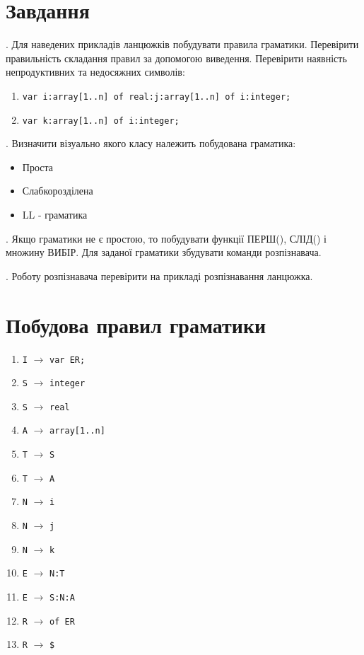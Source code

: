 \section{Завдання}
. Для наведених прикладів ланцюжків побудувати правила граматики.
Перевірити правильність складання правил за допомогою виведення.
Перевірити наявність непродуктивних та недосяжних символів:

\begin{enumerate}
    \item \verb|var i:array[1..n] of real:j:array[1..n] of i:integer;|
    \item \verb|var k:array[1..n] of i:integer;|
\end{enumerate}

. Визначити візуально якого класу належить побудована граматика:
\begin{itemize}
    \item Проста
    \item Слабкорозділена
    \item LL - граматика
\end{itemize}

. Якщо граматики не є простою, то побудувати функції ПЕРШ(), СЛІД()
і множину ВИБІР. Для заданої граматики збудувати команди розпізнавача.

. Роботу розпізнавача перевірити на прикладі розпізнавання ланцюжка.


\newpage
\section{Побудова правил граматики}
\begin{enumerate}
    \item  \verb|I| $\to$ \verb|var ER;|
    \item  \verb|S| $\to$ \verb|integer|
    \item  \verb|S| $\to$ \verb|real|
    \item  \verb|A| $\to$ \verb|array[1..n]|
    \item  \verb|T| $\to$ \verb|S|
    \item  \verb|T| $\to$ \verb|A|
    \item  \verb|N| $\to$ \verb|i|
    \item  \verb|N| $\to$ \verb|j|
    \item  \verb|N| $\to$ \verb|k|
    \item  \verb|E| $\to$ \verb|N:T|
    \item  \verb|E| $\to$ \verb|S:N:A|
    \item  \verb|R| $\to$ \verb|of ER|
    \item  \verb|R| $\to$ \verb|$|
\end{enumerate}


